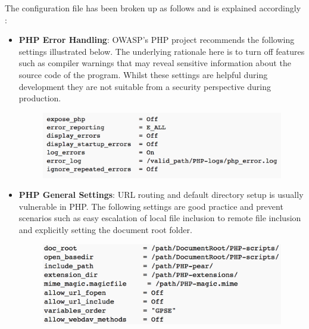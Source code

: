 \begin{enumerate}
    The configuration file has been broken up as follows and is explained accordingly \cite{OWASPa}:
    \begin{itemize}
        \item \textbf{PHP Error Handling}\cite{OWASPb}: OWASP's PHP project recommends the following settings  illustrated below. The underlying rationale here is to turn off features such as compiler warnings that may reveal sensitive information about the source code of the program. Whilst these settings are helpful during development they are not suitable from a security perspective during production.
            \begin{figure}[H]
            	\centering
            	\includegraphics[scale=0.44,center]{chapters/chapter03/figures/errorPHP.png}
            	\label{PHPError}
            \end{figure}   

        \item \textbf{PHP General Settings}\cite{OWASPb}: URL routing and default directory setup is usually vulnerable in PHP. The following settings are good practice and prevent scenarios such as easy escalation of local file inclusion to remote file inclusion and explicitly setting the document root folder.
        
            \begin{figure}[H]
            	\centering
            	\includegraphics[scale=0.44,center]{chapters/chapter03/figures/generalPHP.png}
            	\label{PHPGeneral}
            \end{figure}   
        

\end{itemize}
\end{enumerate}
